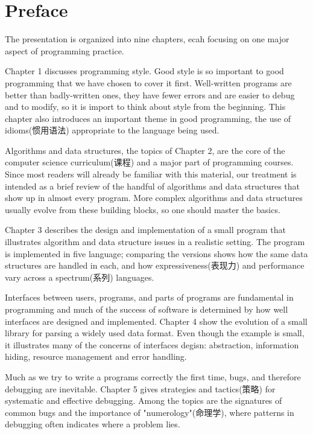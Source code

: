
\chapter{Preface}
The presentation is organized into nine chapters, ecah focusing on one
major aspect of programming practice.

Chapter 1 discusses programming style. Good style is so important to good
programming that we have chosen to cover it first. Well-written programs
are better than badly-written ones, they have fewer errors and are easier
to debug and to modify, so it is import to think about style from the
beginning. This chapter also introduces an important theme in good
programming, the use of idioms(惯用语法) appropriate to the language being
used.

Algorithms and data structures, the topics of Chapter 2, are the core of
the computer science curriculum(课程) and a major part of programming
courses. Since most readers will already be familiar with this material,
our treatment is intended as a brief review of the handful of algorithms
and data structures that show up in almost every program. More complex
algorithms and data structures usually evolve from these building blocks,
so one should master the basics.

Chapter 3 describes the design and implementation of a small program that
illustrates algorithm and data structure issues in a realistic setting. The
program is implemented in five language; comparing the versions shows how
the same data structures are handled in each, and how
expressiveness(表现力) and performance vary across a spectrum(系列)
languages.

Interfaces between users, programs, and parts of programs are fundamental
in programming and much of the success of software is determined by how
well interfaces are designed and implemented. Chapter 4 show the evolution
of a small library for parsing a widely used data format. Even though the
example is small, it illustrates many of the concerns of interfaces degisn:
abstraction, information hiding, resource management and error handling.

Much as we try to write a programs correctly the first time, bugs, and
therefore debugging are inevitable. Chapter 5 gives strategies and
tactics(策略) for systematic and effective debugging. Among the topics are
the signatures of common bugs and the importance of "numerology"(命理学), 
where patterns in debugging often indicates where a problem lies.

